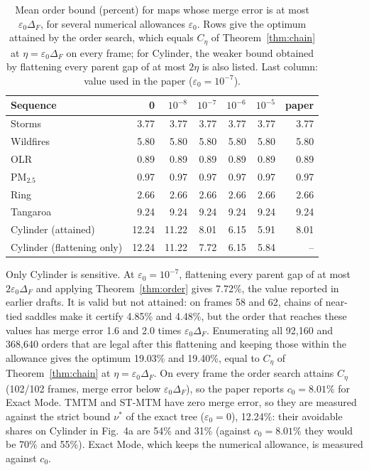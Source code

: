 \begin{table}[H]
\centering\small\setlength{\tabcolsep}{3.2pt}
\caption{Mean order bound (percent) for maps whose merge error is at most $\varepsilon_0\Delta_F$, for several numerical allowances $\varepsilon_0$. Rows give the optimum attained by the order search, which equals $C_\eta$ of Theorem~\ref{thm:chain} at $\eta=\varepsilon_0\Delta_F$ on every frame; for Cylinder, the weaker bound obtained by flattening every parent gap of at most $2\eta$ is also listed. Last column: value used in the paper ($\varepsilon_0=10^{-7}$).}\label{tab:supp_ties}
\begin{tabular}{lrrrrrr}\toprule
Sequence & 0 & $10^{-8}$ & $10^{-7}$ & $10^{-6}$ & $10^{-5}$ & paper\\\midrule
Storms & 3.77 & 3.77 & 3.77 & 3.77 & 3.77 & 3.77\\
Wildfires & 5.80 & 5.80 & 5.80 & 5.80 & 5.80 & 5.80\\
OLR & 0.89 & 0.89 & 0.89 & 0.89 & 0.89 & 0.89\\
PM$_{2.5}$ & 0.97 & 0.97 & 0.97 & 0.97 & 0.97 & 0.97\\
Ring & 2.66 & 2.66 & 2.66 & 2.66 & 2.66 & 2.66\\
Tangaroa & 9.24 & 9.24 & 9.24 & 9.24 & 9.24 & 9.24\\
Cylinder (attained) & 12.24 & 11.22 & 8.01 & 6.15 & 5.91 & 8.01\\
Cylinder (flattening only) & 12.24 & 11.22 & 7.72 & 6.15 & 5.84 & --\\
\bottomrule\end{tabular}
\par\smallskip\parbox{\linewidth}{\footnotesize Only Cylinder is sensitive. At $\varepsilon_0=10^{-7}$, flattening every parent gap of at most $2\varepsilon_0\Delta_F$ and applying Theorem~\ref{thm:order} gives 7.72\%, the value reported in earlier drafts. It is valid but not attained: on frames 58 and 62, chains of near-tied saddles make it certify 4.85\% and 4.48\%, but the order that reaches these values has merge error 1.6 and 2.0 times $\varepsilon_0\Delta_F$. Enumerating all 92{,}160 and 368{,}640 orders that are legal after this flattening and keeping those within the allowance gives the optimum 19.03\% and 19.40\%, equal to $C_\eta$ of Theorem~\ref{thm:chain} at $\eta=\varepsilon_0\Delta_F$. On every frame the order search attains $C_\eta$ (102/102 frames, merge error below $\varepsilon_0\Delta_F$), so the paper reports $c_0=8.01\%$ for Exact Mode. TMTM and ST-MTM have zero merge error, so they are measured against the strict bound $\nu^*$ of the exact tree ($\varepsilon_0=0$), 12.24\%: their avoidable shares on Cylinder in Fig.~4a are 54\% and 31\% (against $c_0=8.01\%$ they would be 70\% and 55\%). Exact Mode, which keeps the numerical allowance, is measured against $c_0$.}
\end{table}
